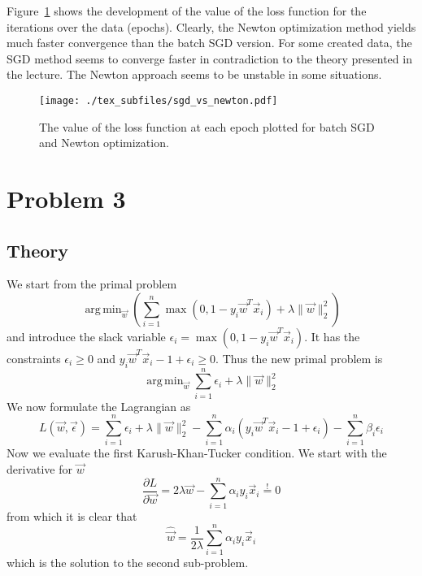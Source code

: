 \documentclass[a4paper]{article}
\DeclareMathOperator*{\argmin}{arg\,min}
\begin{document}
Figure~\ref{fig:sgd_vs_newton} shows the development of the value of the loss
function for the iterations over the data (epochs). Clearly, the Newton
optimization method yields much faster convergence than the batch SGD version.
For some created data, the SGD method seems to converge faster in contradiction
to the theory presented in the lecture. The Newton approach seems to be unstable
in some situations.

\begin{figure}[hbt]
    \texttt{[image: ./tex\_subfiles/sgd\_vs\_newton.pdf]}
    \caption{The value of the loss function at each epoch plotted for batch SGD
    and Newton optimization.}\label{fig:sgd_vs_newton}
\end{figure}

\section{Problem 3}
\subsection{Theory}
We start from the primal problem
\begin{equation*}
    \argmin_{\vec{w}}\left(\sum_{i=1}^{n}\max(0,1-y_i\vec{w}^T\vec{x}_i)
    + \lambda\rVert\vec{w}\lVert_2^2\right)
\end{equation*}
and introduce the slack variable $\epsilon_i=\max(0,1-y_i\vec{w}^T\vec{x}_i)$.
It has the constraints $\epsilon_i\geq0$ and
$y_i\vec{w}^T\vec{x}_i-1+\epsilon_i\geq0$.
Thus the new primal problem is
\begin{equation*}
    \argmin_{\vec{w}} \sum_{i=1}^{n}\epsilon_i + \lambda\rVert\vec{w}\lVert_2^2
\end{equation*}
We now formulate the Lagrangian as
\begin{equation}\label{eq:primal_lagrange}
    L(\vec{w}, \vec{\epsilon}) =
    \sum_{i=1}^{n}\epsilon_i
    + \lambda\rVert\vec{w}\lVert_2^2
    - \sum_{i=1}^{n}\alpha_i(y_i\vec{w}^T\vec{x}_i - 1 + \epsilon_i)
    - \sum_{i=1}^{n}\beta_i\epsilon_i
\end{equation}
Now we evaluate the first Karush-Khan-Tucker condition. We start with the
derivative for $\vec{w}$
\begin{equation*}
    \frac{\partial L}{\partial\vec{w}} =
    2\lambda\vec{w}
    - \sum_{i=1}^{n}\alpha_iy_i\vec{x}_i \stackrel{!}{=} 0
\end{equation*}
from which it is clear that
\begin{equation}\label{eq:w_representation}
    \hat{\vec{w}} = \frac{1}{2\lambda}\sum_{i=1}^{n}\alpha_iy_i\vec{x}_i
\end{equation}
which is the solution to the second sub-problem.
\end{document}
